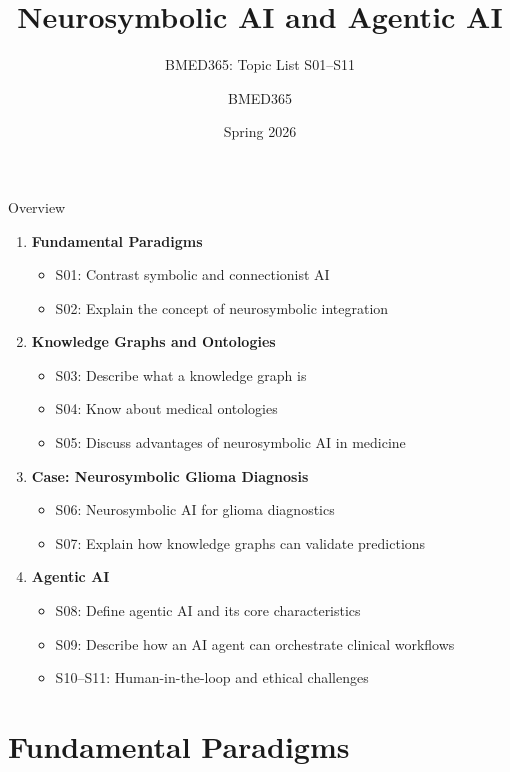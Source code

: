 \documentclass[aspectratio=169, 10pt]{beamer}
\title{Neurosymbolic AI and Agentic AI}
\subtitle{BMED365: Topic List S01--S11}
\author{BMED365}
\date{Spring 2026}
\begin{document}
\begin{frame}
    \titlepage
\end{frame}

\begin{frame}{Overview}
    \begin{enumerate}
        \item \textbf{Fundamental Paradigms}
        \begin{itemize}
            \item S01: Contrast symbolic and connectionist AI
            \item S02: Explain the concept of neurosymbolic integration
        \end{itemize}
        \item \textbf{Knowledge Graphs and Ontologies}
        \begin{itemize}
            \item S03: Describe what a knowledge graph is
            \item S04: Know about medical ontologies
            \item S05: Discuss advantages of neurosymbolic AI in medicine
        \end{itemize}
        \item \textbf{Case: Neurosymbolic Glioma Diagnosis}
        \begin{itemize}
            \item S06: Neurosymbolic AI for glioma diagnostics
            \item S07: Explain how knowledge graphs can validate predictions
        \end{itemize}
        \item \textbf{Agentic AI}
        \begin{itemize}
            \item S08: Define agentic AI and its core characteristics
            \item S09: Describe how an AI agent can orchestrate clinical workflows
            \item S10--S11: Human-in-the-loop and ethical challenges
        \end{itemize}
    \end{enumerate}
\end{frame}

\section{Fundamental Paradigms}
\end{document}
